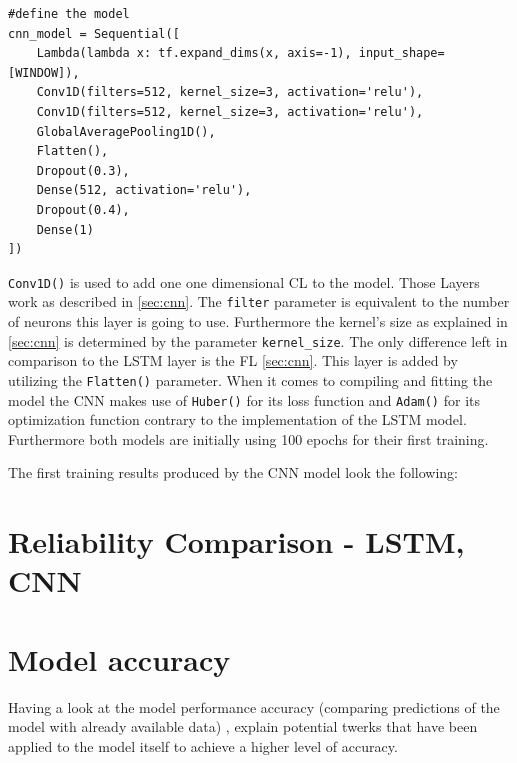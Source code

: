  \begin{lstlisting}
#define the model 
cnn_model = Sequential([
    Lambda(lambda x: tf.expand_dims(x, axis=-1), input_shape=[WINDOW]),
    Conv1D(filters=512, kernel_size=3, activation='relu'),
    Conv1D(filters=512, kernel_size=3, activation='relu'),
    GlobalAveragePooling1D(),
    Flatten(),
    Dropout(0.3),
    Dense(512, activation='relu'),
    Dropout(0.4),
    Dense(1)
])
\end{lstlisting}
\verb|Conv1D()| is used to add one one dimensional CL to the model. Those Layers work as described in \ref{sec:cnn}.  The \verb|filter| parameter is equivalent to the number of neurons this layer is going to use. Furthermore the kernel's size as explained in \ref{sec:cnn} is determined by the parameter \verb|kernel_size|.
The only difference left in comparison to the LSTM layer is the FL \ref{sec:cnn}. This layer is added by utilizing the \verb|Flatten()| parameter. When it comes to compiling and fitting the model the CNN makes use of  \verb|Huber()| for its loss function and \verb|Adam()| for its optimization function contrary to the implementation of the LSTM model. Furthermore both models are initially using 100 epochs for their first training. \newline

The first training results produced by the CNN model look the following: 



\section{Reliability Comparison - LSTM, CNN}

\section{Model accuracy}
Having a look at the model performance accuracy (comparing predictions of the model with already available data) , explain potential twerks that have been applied to the model itself to achieve a higher level of accuracy.

